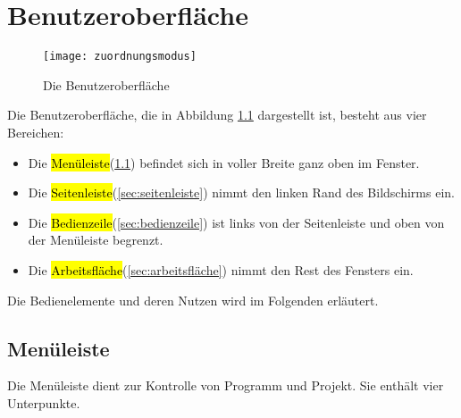 \chapter{Benutzeroberfläche}
\label{ch:benutzeroberfläche}

\begin{figure}
	\texttt{[image: zuordnungsmodus]}
	\caption{Die Benutzeroberfläche}
	\label{fig:die_benutzeroberfläche}
\end{figure}

Die Benutzeroberfläche, die in Abbildung \ref{fig:die_benutzeroberfläche} dargestellt ist, besteht aus vier Bereichen:
\begin{itemize}
	\item Die \hl{Menüleiste}(\ref{sec:menüleiste}) befindet sich in voller Breite ganz oben im Fenster.
	\item Die \hl{Seitenleiste}(\ref{sec:seitenleiste}) nimmt den linken Rand des Bildschirms ein.
	\item Die \hl{Bedienzeile}(\ref{sec:bedienzeile}) ist links von der Seitenleiste und oben von der Menüleiste begrenzt.
	\item Die \hl{Arbeitsfläche}(\ref{sec:arbeitsfläche}) nimmt den Rest des Fensters ein.
\end{itemize}
Die Bedienelemente und deren Nutzen wird im Folgenden erläutert.

\section{Menüleiste}
\label{sec:menüleiste}

Die Menüleiste dient zur Kontrolle von Programm und Projekt. Sie enthält vier Unterpunkte.

